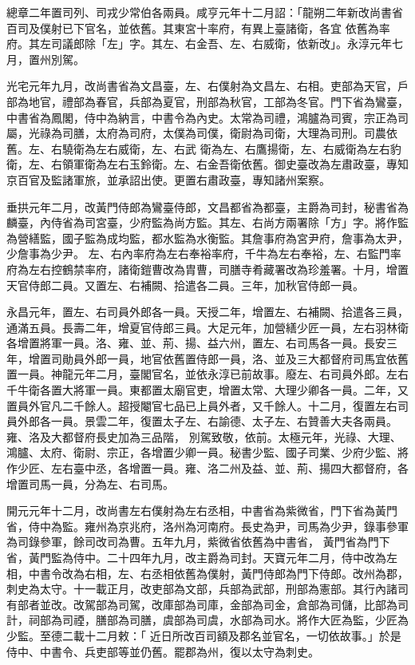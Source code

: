 \begin{pinyinscope}
 總章二年置司列、司戎少常伯各兩員。咸亨元年十二月詔：「龍朔二年新改尚書省百司及僕射已下官名，並依舊。其東宮十率府，有異上臺諸衛，各宜
 依舊為率府。其左司議郎除「左」字。其左、右金吾、左、右威衛，依新改」。永淳元年七月，置州別駕。



 光宅元年九月，改尚書省為文昌臺，左、右僕射為文昌左、右相。吏部為天官，戶部為地官，禮部為春官，兵部為夏官，刑部為秋官，工部為冬官。門下省為鸞臺，中書省為鳳閣，侍中為納言，中書令為內史。太常為司禮，鴻臚為司賓，宗正為司屬，光祿為司膳，太府為司府，太僕為司僕，衛尉為司衛，大理為司刑。司農依舊。左、右驍衛為左右威衛，左、右武
 衛為左、右鷹揚衛，左、右威衛為左右豹衛，左、右領軍衛為左右玉鈴衛。左、右金吾衛依舊。御史臺改為左肅政臺，專知京百官及監諸軍旅，並承詔出使。更置右肅政臺，專知諸州案察。



 垂拱元年二月，改黃門侍郎為鸞臺侍郎，文昌都省為都臺，主爵為司封，秘書省為麟臺，內侍省為司宮臺，少府監為尚方監。其左、右尚方兩署除「方」字。將作監為營繕監，國子監為成均監，都水監為水衡監。其詹事府為宮尹府，詹事為太尹，少詹事為少尹。
 左、右內率府為左右奉裕率府，千牛為左右奉裕，左、右監門率府為左右控鶴禁率府，諸衛鎧曹改為胄曹，司膳寺肴藏署改為珍羞署。十月，增置天官侍郎二員。又置左、右補闕、拾遣各二員。三年，加秋官侍郎一員。



 永昌元年，置左、右司員外郎各一員。天授二年，增置左、右補闕、拾遣各三員，通滿五員。長壽二年，增夏官侍郎三員。大足元年，加營繕少匠一員，左右羽林衛各增置將軍一員。洛、雍、並、荊、揚、益六州，置左、右司馬各一員。長安三
 年，增置司勛員外郎一員，地官依舊置侍郎一員，洛、並及三大都督府司馬宜依舊置一員。神龍元年二月，臺閣官名，並依永淳已前故事。廢左、右司員外郎。左右千牛衛各置大將軍一員。東都置太廟官吏，增置太常、大理少卿各一員。二年，又置員外官凡二千餘人。超授閹官七品已上員外者，又千餘人。十二月，復置左右司員外郎各一員。景雲二年，復置太子左、右諭德、太子左、右贊善大夫各兩員。雍、洛及大都督府長史加為三品階，
 別駕致敬，依前。太極元年，光祿、大理、鴻臚、太府、衛尉、宗正，各增置少卿一員。秘書少監、國子司業、少府少監、將作少匠、左右臺中丞，各增置一員。雍、洛二州及益、並、荊、揚四大都督府，各增置司馬一員，分為左、右司馬。



 開元元年十二月，改尚書左右僕射為左右丞相，中書省為紫微省，門下省為黃門省，侍中為監。雍州為京兆府，洛州為河南府。長史為尹，司馬為少尹，錄事參軍為司錄參軍，餘司改司為曹。五年九月，紫微省依舊為中書省，
 黃門省為門下省，黃門監為侍中。二十四年九月，改主爵為司封。天寶元年二月，侍中改為左相，中書令改為右相，左、右丞相依舊為僕射，黃門侍郎為門下侍郎。改州為郡，刺史為太守。十一載正月，改吏部為文部，兵部為武部，刑部為憲部。其行內諸司有部者並改。改駕部為司駕，改庫部為司庫，金部為司金，倉部為司儲，比部為司計，祠部為司禋，膳部為司膳，虞部為司虞，水部為司水。將作大匠為監，少匠為少監。至德二載十二月敕：「
 近日所改百司額及郡名並官名，一切依故事。」於是侍中、中書令、兵吏部等並仍舊。罷郡為州，復以太守為刺史。




\end{pinyinscope}
